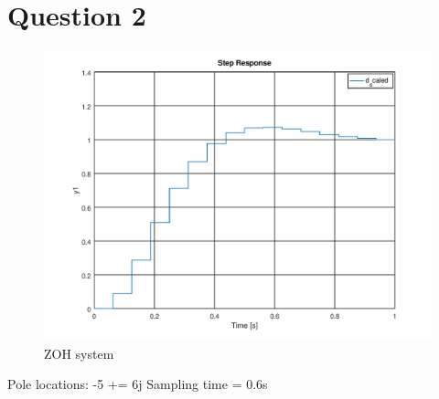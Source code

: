 \documentclass[a4paper, 12pt]{article}
\begin{document}

\section{Question 2}

\begin{figure}[H]
	\centering
	\includegraphics[width=\textwidth]{./img/2_1.png}
	\caption{ZOH system}
	\label{fig:2_1}
\end{figure}

Pole locations: -5 += 6j
Sampling time = 0.6s

\end{document}

